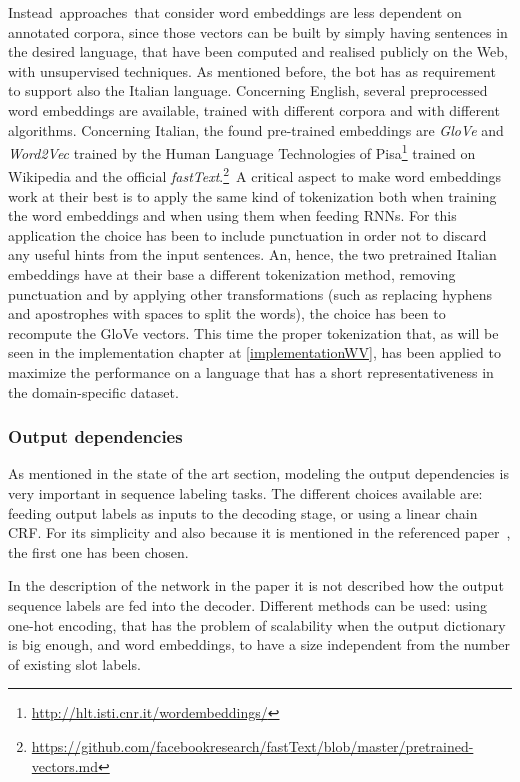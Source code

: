Instead\ approaches\ that consider word embeddings are less dependent on annotated corpora, since those vectors can be built by simply having sentences in the desired language, that have been computed and realised publicly on the  Web, with unsupervised techniques. As mentioned before, the bot has as requirement to support also the Italian language. Concerning English,  several preprocessed word embeddings are available, trained with different corpora and with different algorithms. Concerning Italian, the found pre-trained embeddings are \textit{GloVe} and \textit{Word2Vec} trained by the Human Language Technologies of Pisa\footnote{\url{http://hlt.isti.cnr.it/wordembeddings/}} trained on Wikipedia and the official \textit{fastText}.\footnote{\url{https://github.com/facebookresearch/fastText/blob/master/pretrained-vectors.md}}\ A critical aspect to make word embeddings work at their best is to apply the same kind of tokenization both when training the word embeddings and when using them when feeding RNNs. For this application the choice has been to include punctuation in order not to discard any useful hints from the input sentences. An, hence, the two pretrained Italian embeddings have at their base a different tokenization method, removing punctuation and by applying other transformations (such as replacing hyphens and apostrophes with spaces to split the words),  the choice has been to recompute the GloVe vectors. This time the proper tokenization that, as will be seen in the implementation chapter at \ref{implementationWV}, has been applied to maximize the performance on a language that has a short representativeness in the domain-specific dataset.

\subsubsection{Output dependencies}
As mentioned in the state of the art section, modeling the output dependencies is very important in sequence labeling tasks. The different choices available are: feeding output labels as inputs to the decoding stage, or using a linear chain CRF. For its simplicity and also because it is mentioned in the referenced paper~\cite{liu2016attention}, the first one has been chosen.

In the description of the network in the paper it is not described how the output sequence labels are fed into the decoder. Different methods can be used: using one-hot encoding, that has the problem of scalability when the output dictionary is big enough, and word embeddings, to have a size independent from the number of existing slot labels.

